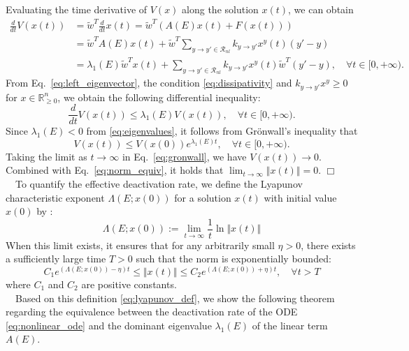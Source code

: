 \documentclass[11pt,a4paper]{article}
\begin{document}
Evaluating the time derivative of $V(x)$ along the solution $x(t)$, we can obtain
\begin{align}
\frac{d}{dt}V(x(t)) &= \tilde{w}^T \frac{d}{dt}x(t)= \tilde{w}^T (A(E) x(t) + F(x(t))) \nonumber \\[0.2cm]
&= \tilde{w}^T A(E) x(t) + \tilde{w}^T \sum_{y \to y' \in \mathcal{R}_{nl}} k_{y \to y'}x^y(t) (y' - y)  \nonumber \\[0.2cm]
&= \lambda_1(E) \tilde{w}^T x(t) + \sum_{y \to y' \in \mathcal{R}_{nl}} k_{y \to y'}x^y(t) \tilde{w}^T (y' - y), \quad \forall t \in [0,+\infty). \label{eq:lyapunov_deriv}
\end{align}
From Eq.~\eqref{eq:left_eigenvector}, the condition \eqref{eq:dissipativity} and $k_{y \to y'} x^y \ge 0$ for $x \in \mathbb{R}^n_{\ge 0}$, we obtain the following differential inequality:
\begin{equation}
\frac{d}{dt}V(x(t)) \le \lambda_1(E) V(x(t)), \quad \forall t \in [0,+\infty).  \label{eq:lyapunov_inequality}
\end{equation}
Since $\lambda_1(E) < 0$ from \eqref{eq:eigenvalues}, it follows from Gr\"{o}nwall's inequality that
\begin{equation}
V(x(t)) \le V(x(0)) e^{\lambda_1(E)t}, \quad \forall t \in [0,+\infty).  \label{eq:gronwall}
\end{equation}
Taking the limit as $t \to \infty$ in Eq.~\eqref{eq:gronwall}, we have $V(x(t)) \to 0$. Combined with Eq.~\eqref{eq:norm_equiv}, it holds that $\lim_{t \to \infty}\Vert{}x(t)\Vert{} = 0$.  \hfill $\Box$\\[0.2cm]
~~To quantify the effective deactivation rate, we define the Lyapunov characteristic exponent $\Lambda(E;x(0))$ for a solution $x(t)$ with initial value $x(0)$ by \cite{LawrencePerko}:
\begin{equation}
\Lambda(E;x(0)) := \lim_{t \to \infty} \frac{1}{t} \ln \Vert{}x(t)\Vert{} \label{eq:lyapunov_def}
\end{equation}
When this limit exists, it ensures that for any arbitrarily small $\eta > 0$, there exists a sufficiently large time $T > 0$ such that the norm is exponentially bounded:
\begin{equation}
C_1 e^{(\Lambda(E;x(0)) - \eta)t} \le \Vert{}x(t)\Vert{} \le C_2 e^{(\Lambda(E;x(0)) + \eta)t}, \quad \forall  t > T \label{eq:lyapunov_bound}
\end{equation}
where $C_1$ and $C_2$ are positive constants.\\
~~Based on this definition \eqref{eq:lyapunov_def}, we show the following theorem regarding the equivalence between the deactivation rate of the ODE \eqref{eq:nonlinear_ode} and the dominant eigenvalue $\lambda_1(E)$ of the linear term $A(E)$.
\end{document}
